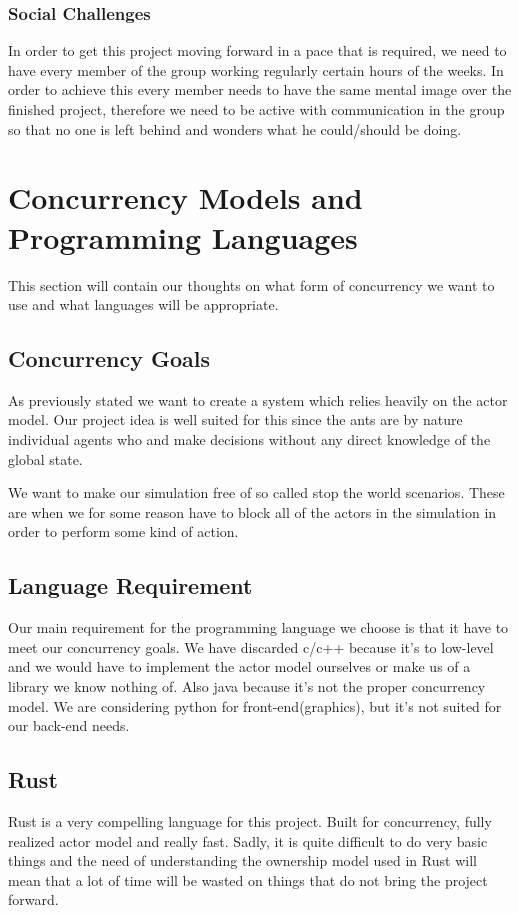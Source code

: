 \documentclass[a4paper]{article}
\begin{document}
\subsubsection{Social Challenges}
In order to get this project moving forward in a pace that is required, we need
to have every member of the group working regularly certain hours of the weeks.
In order to achieve this every member needs to have the same mental image over
the finished project, therefore we need to be active with communication in the
group so that no one is left behind and wonders what he could/should be doing.

\section{Concurrency Models and Programming Languages}
This section will contain our thoughts on what form of concurrency we want to
use and what languages will be appropriate.
\subsection{Concurrency Goals}
As previously stated we want to create a system which relies heavily on the actor
model. Our project idea is well suited for this since the ants are by nature
individual agents who and make decisions without any direct knowledge of the
global state.

We want to make our simulation free of so called stop the world
scenarios. These are when we for some reason have to block all of the actors in
the simulation in order to perform some kind of action.

\subsection{Language Requirement}
Our main requirement for the programming language we choose is that it have to meet our concurrency goals.
We have discarded c/c++ because it's to low-level and we would have to implement the actor model ourselves or make us of a library we know nothing of. 
Also java because it's not the proper concurrency model. We are considering python for front-end(graphics),
but it's not suited for our back-end needs.

\subsection{Rust}
Rust is a very compelling language for this project. Built for concurrency, fully realized
actor model and really fast. Sadly, it is quite difficult to do very basic things and the need
of understanding the ownership model used in Rust will mean that a lot of time will be wasted
on things that do not bring the project forward. 
\end{document}
